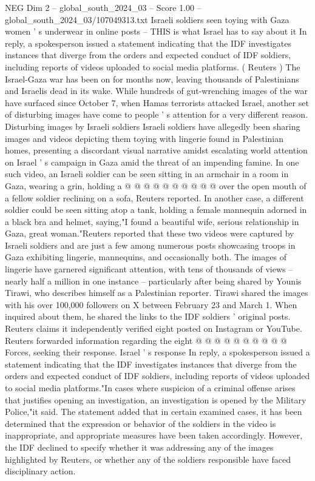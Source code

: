 \begin{textsample}{NEG Dim 2 – global\_south\_2024\_03 – Score 1.00 – global\_south\_2024\_03/107049313.txt}  \label{ex:f2_neg_431}
Israeli soldiers seen toying with Gaza women ' s underwear in online posts -- THIS is what Israel has to say about it In reply, a spokesperson issued a statement indicating that the IDF investigates instances that diverge from the orders and expected conduct of IDF soldiers, including reports of videos uploaded to social media platforms. ( Reuters ) The Israel-Gaza war has been on for months now, leaving thousands of Palestinians and Israelis dead in its wake.
While hundreds of gut-wrenching images of the war have surfaced since October 7, when Hamas terrorists attacked Israel, another set of disturbing images have come to people ' s attention for a very different reason.
Disturbing images by Israeli soldiers Israeli soldiers have allegedly been sharing images and videos depicting them toying with lingerie found in Palestinian homes, presenting a discordant visual narrative amidst escalating world attention on Israel ' s campaign in Gaza amid the threat of an impending famine.
In one such video, an Israeli soldier can be seen sitting in an armchair in a room in Gaza, wearing a grin, holding a @ @ @ @ @ @ @ @ @ @ over the open mouth of a fellow soldier reclining on a sofa, Reuters reported.
In another case, a different soldier could be seen sitting atop a tank, holding a female mannequin adorned in a black bra and helmet, saying,"I found a beautiful wife, serious relationship in Gaza, great woman."Reuters reported that these two videos were captured by Israeli soldiers and are just a few among numerous posts showcasing troops in Gaza exhibiting lingerie, mannequins, and occasionally both.
The images of lingerie have garnered significant attention, with tens of thousands of views -- nearly half a million in one instance -- particularly after being shared by Younis Tirawi, who describes himself as a Palestinian reporter.
Tirawi shared the images with his over 100,000 followers on X between February 23 and March 1.
When inquired about them, he shared the links to the IDF soldiers ' original posts.
Reuters claims it independently verified eight posted on Instagram or YouTube.
Reuters forwarded information regarding the eight @ @ @ @ @ @ @ @ @ @ Forces, seeking their response.
Israel ' s response In reply, a spokesperson issued a statement indicating that the IDF investigates instances that diverge from the orders and expected conduct of IDF soldiers, including reports of videos uploaded to social media platforms."In cases where suspicion of a criminal offense arises that justifies opening an investigation, an investigation is opened by the Military Police,"it said.
The statement added that in certain examined cases, it has been determined that the expression or behavior of the soldiers in the video is inappropriate, and appropriate measures have been taken accordingly.
However, the IDF declined to specify whether it was addressing any of the images highlighted by Reuters, or whether any of the soldiers responsible have faced disciplinary action.

\end{textsample}
